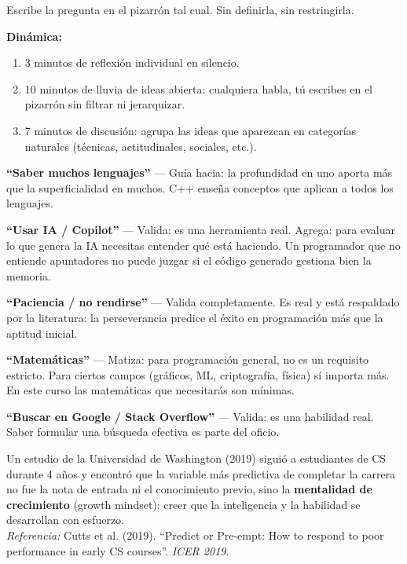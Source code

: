 \documentclass[12pt, oneside]{article}
\begin{document}
Escribe la pregunta en el pizarrón tal cual. Sin definirla, sin restringirla.

\textbf{Dinámica:}
\begin{enumerate}
  \item 3 minutos de reflexión individual en silencio.
  \item 10 minutos de lluvia de ideas abierta: cualquiera habla, tú escribes
        en el pizarrón sin filtrar ni jerarquizar.
  \item 7 minutos de discusión: agrupa las ideas que aparezcan en categorías
        naturales (técnicas, actitudinales, sociales, etc.).
\end{enumerate}

\begin{notaprofesor}

  \textbf{``Saber muchos lenguajes''} — Guía hacia: la profundidad en uno
  aporta más que la superficialidad en muchos. C++ enseña conceptos que
  aplican a todos los lenguajes.

  \vspace{0.4em}
  \textbf{``Usar IA / Copilot''} — Valida: es una herramienta real. Agrega:
  para evaluar lo que genera la IA necesitas entender qué está haciendo. Un
  programador que no entiende apuntadores no puede juzgar si el código
  generado gestiona bien la memoria.

  \vspace{0.4em}
  \textbf{``Paciencia / no rendirse''} — Valida completamente. Es real y
  está respaldado por la literatura: la perseverancia predice el éxito en
  programación más que la aptitud inicial.

  \vspace{0.4em}
  \textbf{``Matemáticas''} — Matiza: para programación general, no es un
  requisito estricto. Para ciertos campos (gráficos, ML, criptografía, física)
  sí importa más. En este curso las matemáticas que necesitarás son mínimas.

  \vspace{0.4em}
  \textbf{``Buscar en Google / Stack Overflow''} — Valida: es una habilidad
  real. Saber formular una búsqueda efectiva es parte del oficio.
\end{notaprofesor}

\begin{notaprofesor}
  Un estudio de la Universidad de Washington (2019) siguió a estudiantes de
  CS durante 4 años y encontró que la variable más predictiva de completar la
  carrera no fue la nota de entrada ni el conocimiento previo, sino la
  \textbf{mentalidad de crecimiento} (growth mindset): creer que la
  inteligencia y la habilidad se desarrollan con esfuerzo.\\
  \textit{Referencia:} Cutts et al. (2019). ``Predict or Pre-empt: How to
  respond to poor performance in early CS courses''. \textit{ICER 2019}.
\end{notaprofesor}
\end{document}
